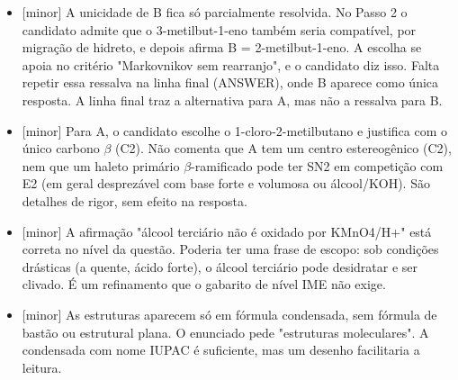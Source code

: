 \documentclass{article}%
\begin{document}
\begin{itemize}%
\item%
{[}minor{]} A unicidade de B fica só parcialmente resolvida. No Passo 2 o candidato admite que o 3{-}metilbut{-}1{-}eno também seria compatível, por migração de hidreto, e depois afirma B = 2{-}metilbut{-}1{-}eno. A escolha se apoia no critério "Markovnikov sem rearranjo", e o candidato diz isso. Falta repetir essa ressalva na linha final (ANSWER), onde B aparece como única resposta. A linha final traz a alternativa para A, mas não a ressalva para B.%
\item%
{[}minor{]} Para A, o candidato escolhe o 1{-}cloro{-}2{-}metilbutano e justifica com o único carbono $\beta$ (C2). Não comenta que A tem um centro estereogênico (C2), nem que um haleto primário $\beta${-}ramificado pode ter SN2 em competição com E2 (em geral desprezável com base forte e volumosa ou álcool/KOH). São detalhes de rigor, sem efeito na resposta.%
\item%
{[}minor{]} A afirmação "álcool terciário não é oxidado por KMnO4/H+" está correta no nível da questão. Poderia ter uma frase de escopo: sob condições drásticas (a quente, ácido forte), o álcool terciário pode desidratar e ser clivado. É um refinamento que o gabarito de nível IME não exige.%
\item%
{[}minor{]} As estruturas aparecem só em fórmula condensada, sem fórmula de bastão ou estrutural plana. O enunciado pede "estruturas moleculares". A condensada com nome IUPAC é suficiente, mas um desenho facilitaria a leitura.%
\end{itemize}%
\end{document}
